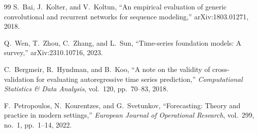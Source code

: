 \documentclass[conference]{IEEEtran}
\begin{document}
\begin{thebibliography}{99}
S.~Bai, J.~Kolter, and V.~Koltun,
``An empirical evaluation of generic convolutional and recurrent networks for sequence modeling,''
arXiv:1803.01271, 2018.

Q.~Wen, T.~Zhou, C.~Zhang, and L.~Sun,
``Time-series foundation models: A survey,''
arXiv:2310.10716, 2023.

C.~Bergmeir, R.~Hyndman, and B.~Koo,
``A note on the validity of cross-validation for evaluating autoregressive time series prediction,''
\emph{Computational Statistics \& Data Analysis}, vol.~120, pp.~70--83, 2018.

F.~Petropoulos, N.~Kourentzes, and G.~Svetunkov,
``Forecasting: Theory and practice in modern settings,''
\emph{European Journal of Operational Research}, vol.~299, no.~1, pp.~1--14, 2022.

\end{thebibliography}
\end{document}
